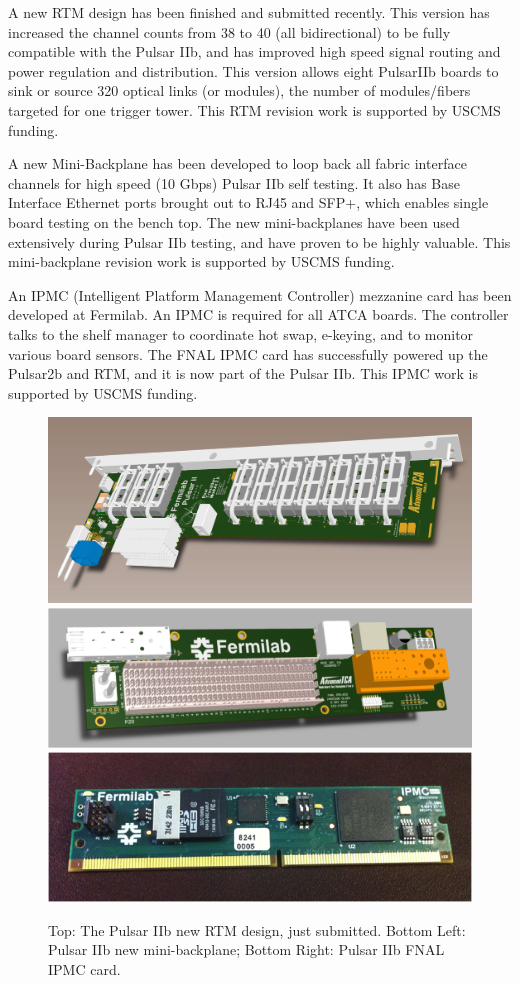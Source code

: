 A new RTM design has been finished and submitted recently. This version has increased the channel counts from 38 to 40 (all bidirectional) to be fully compatible with the Pulsar IIb, and has improved high speed signal routing and power regulation and distribution. This version allows eight PulsarIIb boards to sink or source 320 optical links (or modules), the number of modules/fibers targeted for one trigger tower. This RTM revision work is supported by USCMS funding.

A new Mini-Backplane has been developed to loop back all fabric interface channels for high speed (10 Gbps) Pulsar IIb self testing. It also has Base Interface Ethernet ports brought out to RJ45 and SFP+, which enables single board testing on the bench top. The new mini-backplanes have been used extensively during Pulsar IIb testing, and have proven to be highly valuable.  This mini-backplane revision work is supported by USCMS funding.


An IPMC (Intelligent Platform Management Controller) mezzanine card has been developed at Fermilab. 
An IPMC is required for all ATCA boards.  The controller talks to the shelf manager to coordinate hot swap, e-keying, and to monitor various board sensors. The FNAL IPMC card has successfully powered up the Pulsar2b and RTM, and it is now part of the Pulsar IIb. This IPMC work is supported by USCMS funding.

\begin{figure}[ht!]
\centering
\includegraphics[width=0.8\columnwidth]{Plots/RTM_v20}
\includegraphics[width=0.4\columnwidth]{Plots/FNAL-mini-backplane.png}
\includegraphics[width=0.4\columnwidth]{Plots/FNAL-IPMC.png}
\caption{Top: The Pulsar IIb new RTM design, just submitted. Bottom Left: Pulsar IIb new mini-backplane; Bottom Right: Pulsar IIb FNAL IPMC card.}
\label{fig:PulsarIIb-RTM}
\end{figure}



